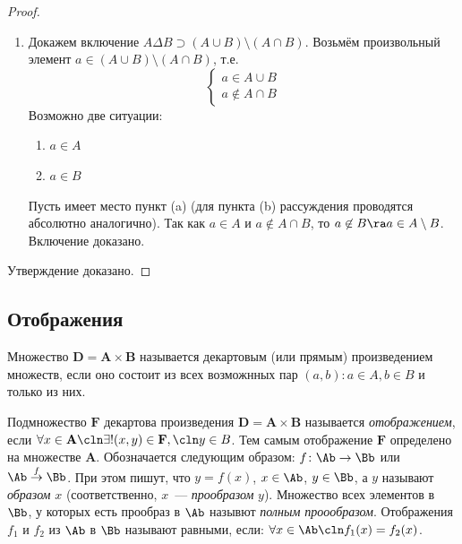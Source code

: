 \begin{itemize}
\begin{proof}
\begin{enumerate}
      \item Докажем включение $A\Delta B \supset (A\cup B)\setminus (A\cap B)$.
        Возьмём произвольный элемент $a\in (A\cup B)\setminus (A\cap B)$, т.е.
        $$
        \left\{
        \begin{array}{l}
          a\in A\cup B\\
          a\not\in A\cap B
        \end{array}
        \right.
        $$
    Возможно две ситуации:
    \begin{enumerate}
      \item $a\in A$
      \item $a\in B$
    \end{enumerate}

    Пусть имеет место пункт (a) (для пункта (b) рассуждения проводятся абсолютно аналогично).
    Так как $a\in A$ и $a\not\in A\cap B$, то $a\not\in B\ra a\in A\setminus B$.
    Включение доказано.
    \end{enumerate}

    Утверждение доказано.
    \end{proof}
\end{itemize}

\subsection{Отображения}

\begin{df}
Множество $\mathbf D=\mathbf A\times\mathbf B$ называется декартовым (или прямым) произве\-де\-ни\-ем множеств, если оно состоит из всех возможнных пар $(a,b)\colon a\in A,b\in B$ и только из них.
\end{df}

\begin{df}
 Подмножество $\mathbf F$ декартова произведения $\mathbf D =\mathbf A \times\mathbf B$ называется \emph{отобра\-же\-нием}, если $\forall x\in\mathbf A\cln\exists!(x,y)\in\mathbf F,\cln y\in B$. Тем самым отображение $\mathbf F$ определено на множестве $\mathbf A$. Обозначается следующим образом: $f\colon \Ab\to \Bb$ или $\Ab\stackrel{f}{\to}\Bb$. При этом
пишут, что $y=f(x)$, $x\in \Ab$, $y\in \Bb$, а $y$ называют \emph{образом} $x$ (соответственно,
$x$~--- \emph{прообразом} $y$). Множество всех элементов в $\Bb$, у которых есть прообраз в $\Ab$ назывют \emph{полным проообразом}. Отображения $f_1$ и $f_2$ из $\Ab$ в $\Bb$ называют равными,
если: $\forall x\in \Ab\cln f_1(x)=f_2(x)$.

\end{df}

